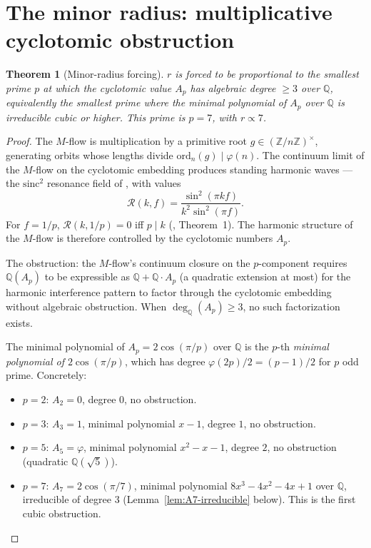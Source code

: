 \documentclass[11pt,reqno]{amsart}
\theoremstyle{plain}
\newtheorem{theorem}{Theorem}
\theoremstyle{definition}
\newcommand{\Z}{\mathbb{Z}}
\newcommand{\Q}{\mathbb{Q}}
\newcommand{\Zns}{(\Z/n\Z)^{\times}}
\newcommand{\sinc}{\mathrm{sinc}}
\newcommand{\ord}{\mathrm{ord}}
\begin{document}
\section{The minor radius: multiplicative cyclotomic obstruction} \label{sec:r-minor}

\begin{theorem}[Minor-radius forcing] \label{thm:r-forced}
$r$ is forced to be proportional to the smallest prime $p$ at which the cyclotomic value $A_p$ has algebraic degree $\geq 3$ over $\Q$, equivalently the smallest prime where the minimal polynomial of $A_p$ over $\Q$ is irreducible cubic or higher. This prime is $p = 7$, with $r \propto 7$.
\end{theorem}

\begin{proof}
The $M$-flow is multiplication by a primitive root $g \in \Zns$, generating orbits whose lengths divide $\ord_n(g) \mid \varphi(n)$. The continuum limit of the $M$-flow on the cyclotomic embedding produces standing harmonic waves --- the $\sinc^2$ resonance field of \cite{SandersGish-FirstG}, with values
\[
\mathcal{R}(k, f) = \frac{\sin^2(\pi k f)}{k^2 \sin^2(\pi f)}.
\]
For $f = 1/p$, $\mathcal{R}(k, 1/p) = 0$ iff $p \mid k$ (\cite{SandersGish-FirstG}, Theorem~1). The harmonic structure of the $M$-flow is therefore controlled by the cyclotomic numbers $A_p$.

The obstruction: the $M$-flow's continuum closure on the $p$-component requires $\Q(A_p)$ to be expressible as $\Q + \Q \cdot A_p$ (a quadratic extension at most) for the harmonic interference pattern to factor through the cyclotomic embedding without algebraic obstruction. When $\deg_{\Q}(A_p) \geq 3$, no such factorization exists.

The minimal polynomial of $A_p = 2 \cos(\pi/p)$ over $\Q$ is the $p$-th \emph{minimal polynomial of $2 \cos(\pi/p)$}, which has degree $\varphi(2p)/2 = (p-1)/2$ for $p$ odd prime. Concretely:
\begin{itemize}
\item $p = 2$: $A_2 = 0$, degree $0$, no obstruction.
\item $p = 3$: $A_3 = 1$, minimal polynomial $x - 1$, degree $1$, no obstruction.
\item $p = 5$: $A_5 = \varphi$, minimal polynomial $x^2 - x - 1$, degree $2$, no obstruction (quadratic $\Q(\sqrt 5)$).
\item $p = 7$: $A_7 = 2 \cos(\pi/7)$, minimal polynomial $8 x^3 - 4 x^2 - 4 x + 1$ over $\Q$, irreducible of degree $3$ (Lemma~\ref{lem:A7-irreducible} below). This is the first cubic obstruction.
\end{itemize}


\end{proof}
\end{document}
